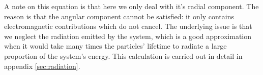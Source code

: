 \documentclass[11pt,a4paper]{article}
\begin{document}
A note on this equation is that here we only deal with it's radial component. The reason is that the angular component cannot be satisfied: it only contains electromagnetic contributions which do not cancel. The underlying issue is that we neglect the radiation emitted by the system, which is a good approximation when it would take many times the particles' lifetime to radiate a large proportion of the system's energy. This calculation is carried out in detail in appendix \ref{sec:radiation}.
\end{document}
